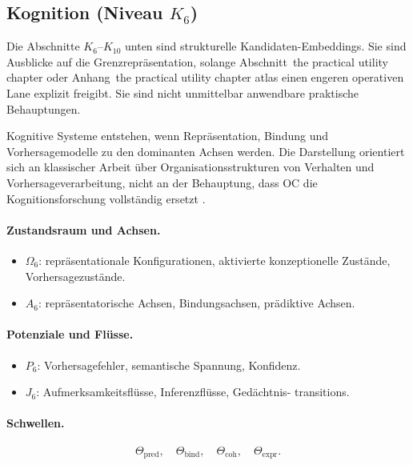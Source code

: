 \subsection{Kognition (Niveau \texorpdfstring{$K_6$}{K6})}

Die Abschnitte \(K_6\)--\(K_{10}\) unten sind strukturelle
Kandidaten-Embeddings.
Sie sind Ausblicke auf die Grenzrepräsentation, solange
Abschnitt~the practical utility chapter oder
Anhang~the practical utility chapter atlas einen engeren operativen
Lane explizit freigibt. Sie sind nicht unmittelbar anwendbare praktische
Behauptungen.

Kognitive Systeme entstehen, wenn Repräsentation, Bindung und Vorhersagemodelle
zu den dominanten Achsen werden.
Die Darstellung orientiert sich an klassischer Arbeit über Organisationsstrukturen
von Verhalten und Vorhersageverarbeitung, nicht an der Behauptung, dass OC die
Kognitionsforschung vollständig ersetzt
\parencite{hebb_organization,friston_free_energy}.

\paragraph{Zustandsraum und Achsen.}
\begin{itemize}
  \item \(\Omega_6\): repräsentationale Konfigurationen, aktivierte
        konzeptionelle Zustände, Vorhersagezustände.
  \item \(A_6\): repräsentatorische Achsen, Bindungsachsen,
        prädiktive Achsen.
\end{itemize}

\paragraph{Potenziale und Flüsse.}
\begin{itemize}
  \item \(P_6\): Vorhersagefehler, semantische Spannung, Konfidenz.
  \item \(J_6\): Aufmerksamkeitsflüsse, Inferenzflüsse, Gedächtnis-
        transitions.
\end{itemize}

\paragraph{Schwellen.}
\[
  \Theta_{\mathrm{pred}},\quad
  \Theta_{\mathrm{bind}},\quad
  \Theta_{\mathrm{coh}},\quad
  \Theta_{\mathrm{expr}}.
\]

